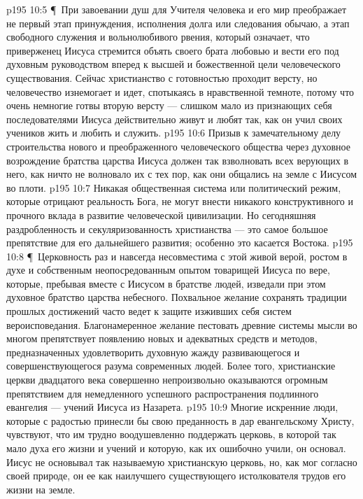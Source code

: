\vs p195 10:5 \P\ При завоевании душ для Учителя человека и его мир преображает не первый этап принуждения, исполнения долга или следования обычаю, а  этап свободного служения и вольнолюбивого рвения, который означает, что приверженец Иисуса стремится объять своего брата любовью и вести его под духовным руководством вперед к высшей и божественной цели человеческого существования. Сейчас христианство с готовностью проходит  версту, но человечество изнемогает и идет, спотыкаясь в нравственной темноте, потому что очень немногие готвы вторую версту --- слишком мало из признающих себя последователями Иисуса действительно живут и любят так, как он учил своих учеников жить и любить и служить.
\vs p195 10:6 Призыв к замечательному делу строительства нового и преображенного человеческого общества через духовное возрождение братства царства Иисуса должен так взволновать всех верующих в него, как ничто не волновало их с тех пор, как они общались на земле с Иисусом во плоти.
\vs p195 10:7 Никакая общественная система или политический режим, которые отрицают реальность Бога, не могут внести никакого конструктивного и прочного вклада в развитие человеческой цивилизации. Но сегодняшняя раздробленность и секуляризованность христианства --- это самое большое препятствие для его дальнейшего развития; особенно это касается Востока.
\vs p195 10:8 \P\ Церковность раз и навсегда несовместима с этой живой верой, ростом в духе и собственным неопосредованным опытом товарищей Иисуса по вере, которые, пребывая вместе с Иисусом в братстве людей, изведали при этом духовное братство царства небесного. Похвальное желание сохранять традиции прошлых достижений часто ведет к защите изживших себя систем вероисповедания. Благонамеренное желание пестовать древние системы мысли во многом препятствует появлению новых и адекватных средств и методов, предназначенных удовлетворить духовную жажду развивающегося и совершенствующегося разума современных людей. Более того, христианские церкви двадцатого века совершенно непроизвольно оказываются огромным препятствием для немедленного успешного распространения подлинного евангелия --- учений Иисуса из Назарета.
\vs p195 10:9 Многие искренние люди, которые с радостью принесли бы свою преданность в дар евангельскому Христу, чувствуют, что им трудно воодушевленно поддержать церковь, в которой так мало духа его жизни и учений и которую, как их ошибочно учили, он основал. Иисус не основывал так называемую христианскую церковь, но, как мог согласно своей природе, он  ее как наилучшего существующего истолкователя трудов его жизни на земле.
